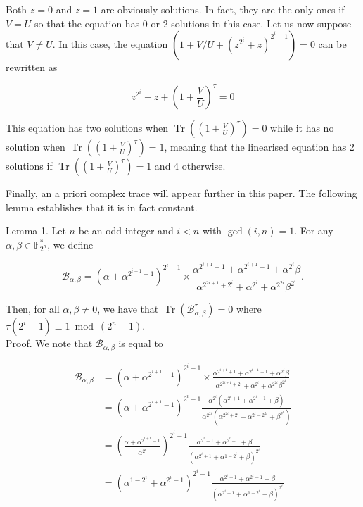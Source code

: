 \documentclass[10pt]{article}
\begin{document}
Both $z=0$ and $z=1$ are obviously solutions. In fact, they are the only ones if $V=U$ so that the equation has 0 or 2 solutions in this case. Let us now suppose that $V \neq U$. In this case, the equation $\left(1+V / U+\left(z^{2^{i}}+z\right)^{2^{i}-1}\right)=0$ can be rewritten as

$$
z^{2^{i}}+z+\left(1+\frac{V}{U}\right)^{\tau}=0
$$

This equation has two solutions when $\operatorname{Tr}\left(\left(1+\frac{V}{U}\right)^{\tau}\right)=0$ while it has no solution when $\operatorname{Tr}\left(\left(1+\frac{V}{U}\right)^{\tau}\right)=1$, meaning that the linearised equation has 2 solutions if $\operatorname{Tr}\left(\left(1+\frac{V}{U}\right)^{\tau}\right)=1$ and 4 otherwise.

Finally, an a priori complex trace will appear further in this paper. The following lemma establishes that it is in fact constant.

Lemma 1. Let $n$ be an odd integer and $i<n$ with $\operatorname{gcd}(i, n)=1$. For any $\alpha, \beta \in \mathbb{F}_{2^{n}}^{*}$, we define

$$
\mathcal{B}_{\alpha, \beta}=\left(\alpha+\alpha^{2^{i+1}-1}\right)^{2^{i}-1} \times \frac{\alpha^{2^{i+1}+1}+\alpha^{2^{i+1}-1}+\alpha^{2^{i}} \beta}{\alpha^{2^{2 i+1}+2^{i}}+\alpha^{2^{i}}+\alpha^{2^{2 i}} \beta^{2^{i}}} .
$$

Then, for all $\alpha, \beta \neq 0$, we have that $\operatorname{Tr}\left(\mathcal{B}_{\alpha, \beta}^{\tau}\right)=0$ where $\tau\left(2^{i}-1\right) \equiv 1 \bmod \left(2^{n}-1\right)$.\\
Proof. We note that $\mathcal{B}_{\alpha, \beta}$ is equal to

$$
\begin{aligned}
\mathcal{B}_{\alpha, \beta} & =\left(\alpha+\alpha^{2^{i+1}-1}\right)^{2^{i}-1} \times \frac{\alpha^{2^{i+1}+1}+\alpha^{2^{i+1}-1}+\alpha^{2^{i}} \beta}{\alpha^{2^{2 i+1}+2^{i}}+\alpha^{2^{i}}+\alpha^{2^{2 i}} \beta^{2^{i}}} \\
& =\left(\alpha+\alpha^{2^{i+1}-1}\right)^{2^{i}-1} \frac{\alpha^{2^{i}}\left(\alpha^{2^{i}+1}+\alpha^{2^{i}-1}+\beta\right)}{\alpha^{2^{2 i}}\left(\alpha^{2^{2 i}+2^{i}}+\alpha^{2^{i}-2^{2 i}}+\beta^{2^{i}}\right)} \\
& =\left(\frac{\alpha+\alpha^{2^{i+1}-1}}{\alpha^{2^{i}}}\right)^{2^{i}-1} \frac{\alpha^{2^{i}+1}+\alpha^{2^{i}-1}+\beta}{\left(\alpha^{2^{i}+1}+\alpha^{1-2^{i}}+\beta\right)^{2^{i}}} \\
& =\left(\alpha^{1-2^{i}}+\alpha^{2^{i}-1}\right)^{2^{i}-1} \frac{\alpha^{2^{i}+1}+\alpha^{2^{i}-1}+\beta}{\left(\alpha^{2^{i}+1}+\alpha^{1-2^{i}}+\beta\right)^{2^{i}}}
\end{aligned}
$$
\end{document}

